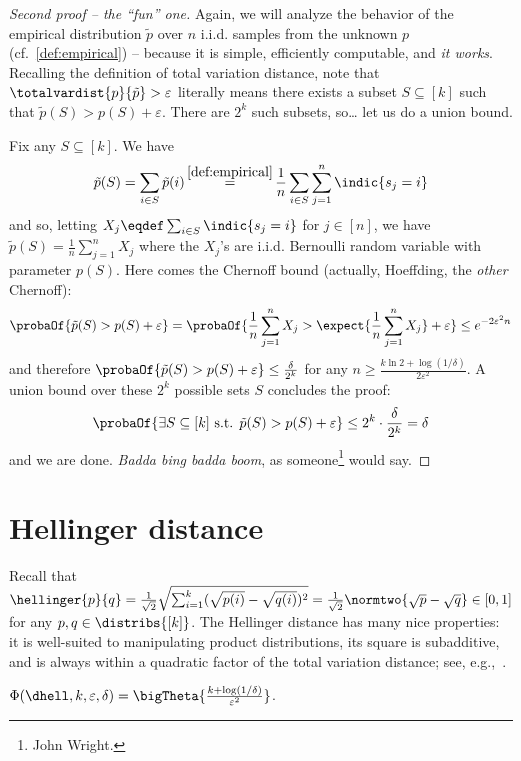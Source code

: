 \documentclass[10pt]{article}
\newcommand{\dst}{\varepsilon}
\newcommand{\ab}{k}
\newcommand{\ns}{n}
\begin{document}
\begin{proof}[Second proof -- the ``fun'' one]
Again, we will analyze the behavior of the empirical distribution $\tilde{p}$ over $\ns$ i.i.d. samples from the unknown $p$ (cf.~\eqref{def:empirical}) -- because it is simple, efficiently computable, and \emph{it works}.  Recalling the definition of total variation distance, note that $\totalvardist{p}{\tilde{p}} > \dst$ literally means there exists a subset $S\subseteq [\ab]$ such that $\tilde{p}(S) > p(S) + \dst$. There are $2^\ab$ such subsets, so\dots{} let us do a union bound.

Fix any $S\subseteq[\ab]$. We have
\[
	\tilde{p}(S) = \sum_{i\in S} \tilde{p}(i) \operatorname*{=}^{\eqref{def:empirical}} \frac{1}{\ns} \sum_{i\in S} \sum_{j=1}^\ns \indic{s_j=i}
\]
and so, letting $X_j \eqdef \sum_{i\in S}\indic{s_j=i}$ for $j\in [\ns]$, we have
$
\tilde{p}(S) = \frac{1}{\ns}\sum_{j=1}^\ns X_j
$ where the $X_j$'s are i.i.d. Bernoulli random variable with parameter $p(S)$. Here comes the Chernoff bound (actually, Hoeffding, the \emph{other} Chernoff):
\[
    \probaOf{ \tilde{p}(S) > p(S) + \dst } = \probaOf{ \frac{1}{\ns}\sum_{j=1}^\ns X_j > \expect{\frac{1}{\ns}\sum_{j=1}^\ns X_j} + \dst } \leq e^{-2\dst^2 \ns}
\]
and therefore $\probaOf{ \tilde{p}(S) > p(S) + \dst } \leq \frac{\delta}{2^\ab}$ for any $\ns\geq \frac{\ab\ln 2+\log(1/\delta)}{2\dst^2}$. A union bound over these $2^\ab$ possible sets $S$ concludes the proof:
\[
    \probaOf{ \exists S\subseteq [\ab] \text{ s.t. }\tilde{p}(S) > p(S) + \dst } \leq 2^\ab\cdot \frac{\delta}{2^\ab} = \delta
\]
and we are done. \emph{Badda bing badda boom}, as someone\footnote{John Wright.} would say.
\end{proof}

\section{Hellinger distance}

Recall that $\hellinger{p}{q} = \frac{1}{\sqrt{2}}\sqrt{\sum_{i=1}^\ab (\sqrt{p(i)}-\sqrt{q(i)})^2} = \frac{1}{\sqrt{2}}\normtwo{\sqrt{p}-\sqrt{q}}\in[0,1]$ for any $p,q\in\distribs{[\ab]}$. The Hellinger distance has many nice properties: it is well-suited to manipulating product distributions, its square is subadditive, and is always within a quadratic factor of the total variation distance; see, e.g.,~\cite[Appendix~C.2]{Canonne:15}.

\begin{theorem}\label{theo:learning:hellinger}
  $\Phi(\dhell,\ab,\dst,\delta) = \bigTheta{\frac{\ab+\log(1/\delta)}{\dst^2}}$.
\end{theorem}
\end{document}
